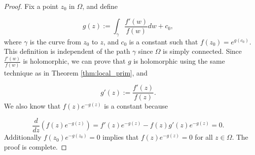 \documentclass{article}
\begin{document}
\begin{proof}
Fix a point $z_0$ in $\Omega$, and define

\begin{equation*}
g(z):=\int_\gamma \frac{f'(w)}{f(w)}dw+c_0,
\end{equation*}
where $\gamma$ is the curve from $z_0$ to $z$, and $c_0$ is a constant such that $f(z_0)=e^{g(c_0)}$. This definition is independent of the path $\gamma$ since $\Omega$ is simply connected. Since $\frac{f'(w)}{f(w)}$ is holomorphic, we can prove that $g$ is holomorphic using the same technique as in Theorem \ref{thm:local_prim}, and 

\begin{equation*}
g'(z):=\frac{f'(z)}{f(z)}.
\end{equation*}
We also know that $f(z)e^{-g(z)}$ is a constant because 

\begin{equation*}
\frac{d}{dz}(f(z)e^{-g(z)})=f'(z)e^{-g(z)}-f(z)g'(z)e^{-g(z)}=0.
\end{equation*}
Additionally $f(z_0)e^{-g(z_0)}=0$ implies that $f(z)e^{-g(z)}=0$ for all $z\in\Omega$. The proof is complete. 


\end{proof}
\end{document}
